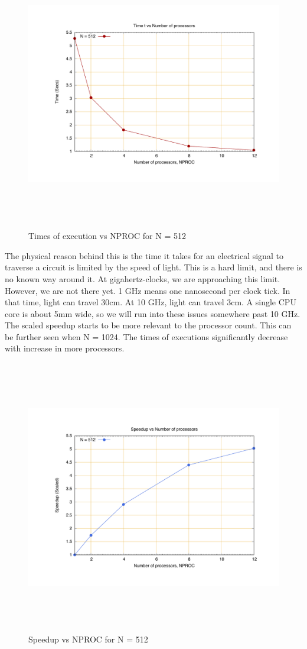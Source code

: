 \documentclass[fleqn,letterpaper,12pt]{report}
\begin{document}
\begin{figure}[htbp]
	\centering
	\includegraphics[height=120mm,width=160mm]{512.pdf}
	\caption{Times of execution vs NPROC for N = 512\label{overflow}}
\end{figure}
The physical reason behind this is the time it takes for an electrical signal to traverse a circuit is limited by the speed of light. This is a hard limit, and there is no known way around it. At gigahertz-clocks, we are approaching this limit. However, we are not there yet. 1 GHz means one nanosecond per clock tick. In that time, light can travel 30cm. At 10 GHz, light can travel 3cm. A single CPU core is about 5mm wide, so we will run into these issues somewhere past 10 GHz.
\newpage
The scaled speedup starts to be more relevant to the processor count. This can be further seen when N = 1024. The times of executions significantly decrease with increase in more processors.
\begin{figure}[htbp]
	\centering
	\includegraphics[height=120mm,width=160mm]{512smat.pdf}
	\caption{Speedup vs NPROC for N = 512\label{overflow}}
\end{figure}
\end{document}
